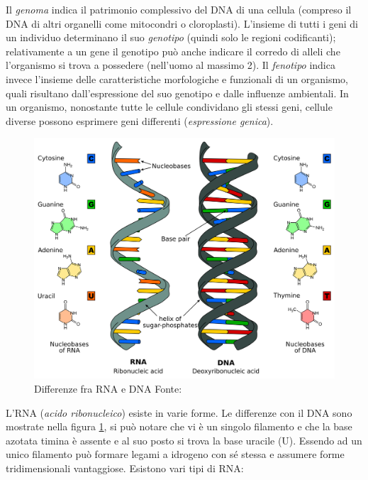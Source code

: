 \par Il \textit{genoma} indica il patrimonio complessivo del DNA di una cellula (compreso il DNA di altri organelli come mitocondri o cloroplasti). L'insieme di tutti i geni di un individuo determinano il suo \textit{genotipo} (quindi solo le regioni codificanti); relativamente a un gene il genotipo può anche indicare il corredo di alleli che l'organismo si trova a possedere (nell'uomo al massimo 2). Il \textit{fenotipo} indica invece l'insieme delle caratteristiche morfologiche e funzionali di un organismo, quali risultano dall'espressione del suo genotipo e dalle influenze ambientali. In un organismo, nonostante tutte le cellule condividano gli stessi geni, cellule diverse possono esprimere geni differenti (\textit{espressione genica}).

\begin{figure}[h]
	\centering
	\includegraphics[scale=0.15]{images/dna-rna.png}
	\caption{Differenze fra RNA e DNA Fonte: \cite{dna-rna-image}}
	\label{fig:rna-dna-differenze}
\end{figure}

\par L'RNA (\textit{acido ribonucleico}) esiste in varie forme. Le differenze con il DNA sono mostrate nella figura \ref{fig:rna-dna-differenze}, si può notare che vi è un singolo filamento e che la base azotata timina è assente e al suo posto si trova la base uracile (U). Essendo ad un unico filamento può formare legami a idrogeno con sé stessa e assumere forme tridimensionali vantaggiose. Esistono vari tipi di RNA: 

